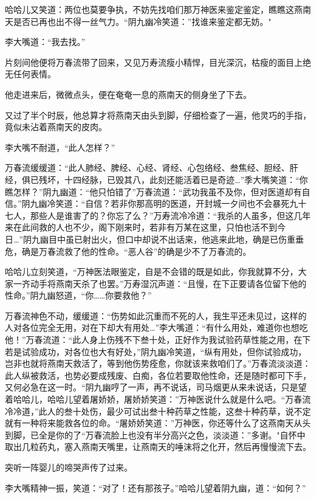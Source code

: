 \documentclass[12pt,oneside]{book}
\begin{document}
哈哈儿又笑道：两位也莫要争执，不妨先找咱们那万神医来鉴定鉴定，瞧瞧这燕南天是否已再也出不得一丝气力。``阴九幽冷笑道：''找谁来鉴定都无妨。"

李大嘴道：``我去找。''

片刻间他便将万春流带了回来，又见万寿流瘦小精悍，目光深沉，枯瘦的面目上绝无任何表情。

他走进来后，微微点头，便在奄奄一息的燕南天的侧身坐了下去。

又过了半个时辰，他总算才将燕南天由头到脚，仔细检查了一遍，他灵巧的手指，竟似未沾着燕南天的皮肉。

李大嘴不耐道，``此人怎样？''

万春流缓缓道：``此人肺经、脾经、心经、肾经、心包络经、叁焦经、胆经、肝经，俱已残坏，十四经脉，已毁其八，此刻还能活着已是奇迹\ldots{}''季大嘴笑道：``你瞧怎样？''阴九幽道：``他只怕错了''万春流道：``武功我虽不及你，但对医道却有自信。''阴九幽冷笑道：``自信？若非你那高明的医道，开封城一夕间也不会暴死九十七人，那些人是谁害了的？你忘了么？''万寿流冷冷道：``我杀的人虽多，但这几年来在此间救的人也不少，阁下刚来时，若非有万某在这里，只怕也活不到今日\ldots{}''阴九幽目中虽已射出火，但口中却说不出话来，他逃来此地，确是已伤重垂危，确是万春流救了他的性命。``恶人谷''的确是少不了万春流的。

哈哈儿立刻笑道，``万神医法眼鉴定，自是不会错的既是如此，你我就算不分，大家一齐动手将燕南天杀了也罢。''万寿湿沉声道：``且慢，在下正要请各位留下他的性命。''阴九幽怒道，``你\ldots\ldots 你要救他？''

万春流神色不动，缓缓道：``伤势如此沉重而不死的人，我生平还未见过，这样的人对各位完全无用，对在下却大有用处\ldots{}''李大嘴道：``有什么用处，难道你也想吃他！''万春流道：``此人身上伤残不下叁十处，正好作为我试验药草性能之用，在下若是试验成功，对各位也大有好处，''阴九幽冷笑道，``纵有用处，但你试验成功，岂非也就将燕南天救活了，等到他伤势痊愈，你就该来救咱们了。''万春流淡淡道：此人纵被救活，也势必要成残废、白痴，各位若要取他性命，还是随时都可下手，又何必急在这一时。``阴九幽哼了一声，再不说话，司马烟更从来未说话，只是望着哈哈儿，哈哈儿望着屠娇娇，屠娇娇笑道：''万神医说什么就是什么吧。``万春流冷冷道，''此人的叁十处伤，最少可试出叁十种药草之性能，这叁十种药草，说不定就有一种将来能救各位的命。``屠娇娇笑道：''万神医，你还等什么了这燕南天从头到脚，已全是你的了``万春流脸上也没有半分高兴之色，淡淡道：''多谢。"自怀中取出几粒药丸，塞入燕南天嘴里，让燕南天的唾沫将之化开，然后再慢慢流下去。

突听一阵婴儿的啼哭声传了过来。

李大嘴精神一振，笑道：``对了！还有那孩子。''哈哈儿望着阴九幽，道：``如何？''
\end{document}
